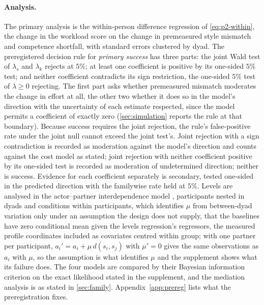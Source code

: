\paragraph{Analysis.} The primary analysis is the within-person difference regression of \eqref{eq:p2-within}, the change in the workload score on the change in premeasured style mismatch and competence shortfall, with standard errors clustered by dyad. The preregistered decision rule for \emph{primary success} has three parts: the joint Wald test of $\lambda_s$ and $\lambda_k$ rejects at $5\%$; at least one coefficient is positive by its one-sided $5\%$ test; and neither coefficient contradicts its sign restriction, the one-sided $5\%$ test of $\lambda \ge 0$ rejecting. The first part asks whether premeasured mismatch moderates the change in effort at all, the other two whether it does so in the model's direction with the uncertainty of each estimate respected, since the model permits a coefficient of exactly zero (\autoref{sec:simulation} reports the rule at that boundary). Because success requires the joint rejection, the rule's false-positive rate under the joint null cannot exceed the joint test's. Joint rejection with a sign contradiction is recorded as moderation against the model's direction and counts against the cost model as stated; joint rejection with neither coefficient positive by its one-sided test is recorded as moderation of undetermined direction; neither is success. Evidence for each coefficient separately is secondary, tested one-sided in the predicted direction with the familywise rate held at $5\%$. Levels are analysed in the actor--partner interdependence model \cite{Kenny2006}, participants nested in dyads and conditions within participants, which identifies $\mu$ from between-dyad variation only under an assumption the design does not supply, that the baselines have zero conditional mean given the levels regression's regressors, the measured profile coordinates included as covariates centred within group; with one partner per participant, $a_i' = a_i + \mu\, d(s_i, s_j)$ with $\mu' = 0$ gives the same observations as $a_i$ with $\mu$, so the assumption is what identifies $\mu$ and the supplement shows what its failure does. The four models are compared by their Bayesian information criterion on the exact likelihood stated in the supplement, and the mediation analysis is as stated in \autoref{sec:family}. Appendix~\ref{app:prereg} lists what the preregistration fixes.

